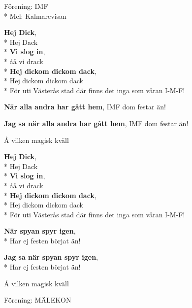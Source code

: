\begin{SongText}
    \begin{SongInfo}
        Förening: IMF\\*%
        Mel: Kalmarevisan
    \end{SongInfo}
    \begin{Verse}
        \textbf{Hej Dick}, \\*%
        Hej Dack\\*%
        \textbf{Vi slog in}, \\*%
        åå vi drack\\*%
        \textbf{Hej dickom dickom dack}, \\*%
        Hej dickom dickom dack\\*%
        För uti Västerås stad där finns det inga som våran I-M-F!
    \end{Verse}
    \begin{Verse}
        \textbf{När alla andra har gått hem}, IMF dom festar än!

        \textbf{Jag sa när alla andra har gått hem}, IMF dom festar än!

        Å vilken magisk kväll
    \end{Verse}
    \begin{Verse}
        \textbf{Hej Dick}, \\*%
        Hej Dack\\*%
        \textbf{Vi slog in}, \\*%
        åå vi drack\\*%
        \textbf{Hej dickom dickom dack}, \\*%
        Hej dickom dickom dack\\*%
        För uti Västerås stad där finns det inga som våran I-M-F!
    \end{Verse}
    \begin{Verse}
        \textbf{När spyan spyr igen}, \\*%
        Har ej festen börjat än!

        \textbf{Jag sa när spyan spyr igen}, \\*%
        Har ej festen börjat än!

        Å vilken magisk kväll

    \end{Verse}
\end{SongText}

\begin{SongText}[???]
    \begin{SongInfo}
        Förening: MÄLEKON
    \end{SongInfo}
    \begin{Verse}
        [NO SONG]
    \end{Verse}
\end{SongText}


